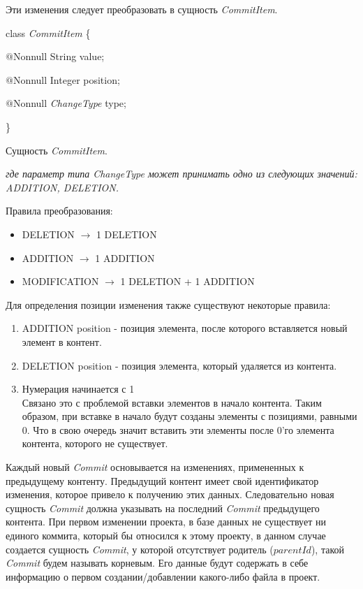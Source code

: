 \documentclass[a4paper,14pt]{extreport} %
\begin{document}
Эти изменения следует преобразовать в сущность \textit{CommitItem}.

\begin{algorithm}[H]
class \textit{CommitItem} \{

	\hspace{0.5cm}$@$Nonnull 		String 							value;
	
	\hspace{0.5cm}$@$Nonnull		Integer							position;
	
	\hspace{0.5cm}$@$Nonnull		\textit{ChangeType}		type;
	
\}
\caption{Сущность \textit{CommitItem}.}
\label{entity_commit_item}
\end{algorithm}
\vspace{0.2cm}
\textit{где параметр типа \textit{ChangeType} может принимать одно из следующих значений: ADDITION, DELETION.}

Правила преобразования:
\begin{itemize}
\item DELETION $\rightarrow$ 1 DELETION
\item ADDITION $\rightarrow$ 1 ADDITION
\item MODIFICATION $\rightarrow$ 1 DELETION + 1 ADDITION
\end{itemize}

Для определения позиции изменения также существуют некоторые правила:
\begin{enumerate}
\item ADDITION position - позиция элемента, после которого вставляется новый элемент в контент.
\item DELETION position - позиция элемента, который удаляется из контента.
\item Нумерация начинается с 1 \\
Связано это с проблемой вставки элементов в начало контента. Таким образом, при вставке в начало будут созданы элементы с позициями, равными 0. Что в свою очередь значит вставить эти элементы после 0'го элемента контента, которого не существует.
\end{enumerate}

Каждый новый \textit{Commit} основывается на изменениях, примененных к предыдущему контенту. Предыдущий контент имеет свой идентификатор изменения, которое привело к получению этих данных. Следовательно новая сущность \textit{Commit} должна указывать на последний \textit{Commit} предыдущего контента. При первом изменении проекта, в базе данных не существует ни единого коммита, который бы относился к этому проекту, в данном случае создается сущность \textit{Commit}, у которой отсутствует родитель ($parentId$), такой \textit{Commit} будем называть корневым. Его данные будут содержать в себе информацию о первом создании/добавлении какого-либо файла в проект.
\end{document}
